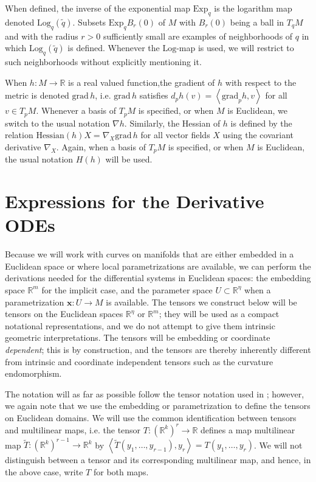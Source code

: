 \documentclass[final]{svjour3}
\newcommand{\RR}{\mathbb{R}}
\newcommand{\grad}{\mathrm{grad}}
\newcommand{\ip}[1]{\left<#1\right>}
\newcommand{\Exp}{\mathrm{Exp}}
\newcommand{\Log}{\mathrm{Log}}
\newcommand{\Hess}{H}
\newcommand{\param}[1]{\mathbf{#1}}
\begin{document}
When defined, the inverse of the exponential map $\Exp_q$ is the
logarithm map denoted $\Log_q(\tilde{q})$. Subsets $\Exp_qB_r(0)$ of $M$ with
$B_r(0)$ being a ball in $T_qM$ and with the radius $r>0$ sufficiently small
are examples of neighborhoods of $q$ in which 
$\Log_q(\tilde{q})$ is defined. Whenever the $\Log$-map is used, 
we will restrict to such neighborhoods without explicitly mentioning it.

When $h:M\to\RR$ is a real valued function,the
gradient of $h$ with respect to the metric is denoted $\grad\,h$, i.e. 
$\grad\,h$ satisfies $d_ph(v) = \ip{\grad_p h,v}$ for all $v\in
T_pM$. Whenever a basis of $T_pM$ is specified, or when $M$ is Euclidean, we switch 
to the usual notation $\nabla h$. Similarly, the Hessian of
$h$ is defined by the relation $\text{Hessian}(h)X = \nabla_X \grad\,h$ for all
vector fields $X$ using the covariant derivative $\nabla_X$. Again, when a basis of $T_pM$ is specified, or when $M$ is
Euclidean, the usual notation $\Hess(h)$ will be used. 


\section{Expressions for the Derivative ODEs}
\label{app:A}
Because we will work with curves on manifolds that are either embedded in a
Euclidean space or where local parametrizations are available, we can perform
the derivations needed for the differential systems in Euclidean
spaces: the embedding space $\RR^m$ for the implicit case, and the parameter
space $U\subset\RR^\eta$ when a parametrization $\param{x}:U\rightarrow M$ is
available. The tensors we construct below will be tensors on the Euclidean
spaces $\RR^\eta$ or
$\RR^m$; they will be used as a compact notational representations,
and we do not attempt to give them intrinsic geometric
interpretations. The tensors will be embedding or coordinate \emph{dependent}; this is
by construction, and the tensors are thereby inherently different from
intrinsic and coordinate independent tensors such as the curvature endomorphism.

The notation will as far as possible follow the tensor notation used in
\cite{do_carmo_riemannian_1992}; however, we again note that
we use the embedding or parametrization to define the tensors 
on Euclidean domains. We will use the common identification 
between tensors and multilinear maps, i.e.
the tensor $T:(\RR^k)^r\rightarrow\RR$ defines a map multilinear map
$\tilde{T}:(\RR^k)^{r-1}\rightarrow\RR^k$ by
$\ip{\tilde{T}(y_1,\ldots,y_{r-1}),y_r}=T(y_1,\ldots,y_r)$. We will not
distinguish between a tensor and its corresponding multilinear map, and hence,
in the above case, write $T$ for both maps. 
\end{document}
